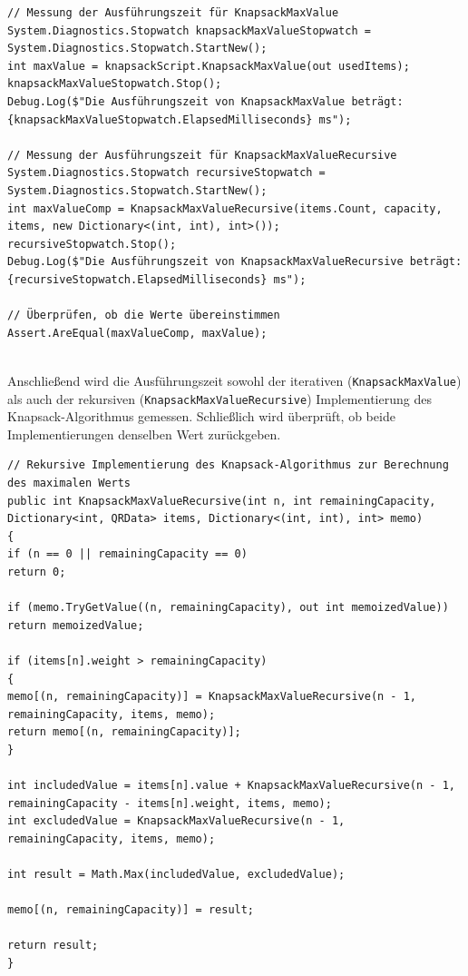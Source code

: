 \begin{lstlisting}[style=csharp, caption={Zeitmessung}, label=code:Zeitmessung]
// Messung der Ausführungszeit für KnapsackMaxValue
System.Diagnostics.Stopwatch knapsackMaxValueStopwatch = System.Diagnostics.Stopwatch.StartNew();
int maxValue = knapsackScript.KnapsackMaxValue(out usedItems);
knapsackMaxValueStopwatch.Stop();
Debug.Log($"Die Ausführungszeit von KnapsackMaxValue beträgt: {knapsackMaxValueStopwatch.ElapsedMilliseconds} ms");

// Messung der Ausführungszeit für KnapsackMaxValueRecursive
System.Diagnostics.Stopwatch recursiveStopwatch = System.Diagnostics.Stopwatch.StartNew();
int maxValueComp = KnapsackMaxValueRecursive(items.Count, capacity, items, new Dictionary<(int, int), int>());
recursiveStopwatch.Stop();
Debug.Log($"Die Ausführungszeit von KnapsackMaxValueRecursive beträgt: {recursiveStopwatch.ElapsedMilliseconds} ms");

// Überprüfen, ob die Werte übereinstimmen
Assert.AreEqual(maxValueComp, maxValue);
\end{lstlisting}\\

Anschließend wird die Ausführungszeit sowohl der iterativen (\texttt{KnapsackMaxValue}) als auch der
rekursiven (\texttt{KnapsackMaxValueRecursive}) Implementierung des Knapsack-Algorithmus gemessen. Schließlich wird
überprüft, ob beide Implementierungen denselben Wert zurückgeben.

\newpage

\begin{lstlisting}[style=csharp, caption={Rekursiver Algorithmus}, label=code:Rekursiver Algorithmus]
// Rekursive Implementierung des Knapsack-Algorithmus zur Berechnung des maximalen Werts
public int KnapsackMaxValueRecursive(int n, int remainingCapacity, Dictionary<int, QRData> items, Dictionary<(int, int), int> memo)
{
if (n == 0 || remainingCapacity == 0)
return 0;

if (memo.TryGetValue((n, remainingCapacity), out int memoizedValue))
return memoizedValue;

if (items[n].weight > remainingCapacity)
{
memo[(n, remainingCapacity)] = KnapsackMaxValueRecursive(n - 1, remainingCapacity, items, memo);
return memo[(n, remainingCapacity)];
}

int includedValue = items[n].value + KnapsackMaxValueRecursive(n - 1, remainingCapacity - items[n].weight, items, memo);
int excludedValue = KnapsackMaxValueRecursive(n - 1, remainingCapacity, items, memo);

int result = Math.Max(includedValue, excludedValue);

memo[(n, remainingCapacity)] = result;

return result;
}
\end{lstlisting}\\

